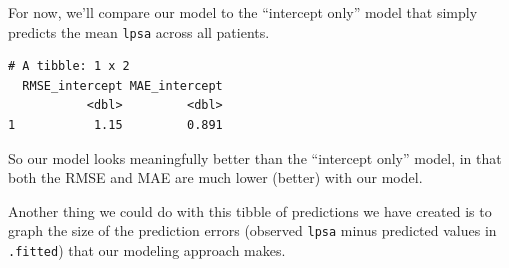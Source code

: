 \documentclass[]{book}
\newenvironment{Shaded}{\begin{snugshade}}{\end{snugshade}}
\newcommand{\KeywordTok}[1]{\textcolor[rgb]{0.13,0.29,0.53}{\textbf{#1}}}
\newcommand{\DataTypeTok}[1]{\textcolor[rgb]{0.13,0.29,0.53}{#1}}
\newcommand{\DecValTok}[1]{\textcolor[rgb]{0.00,0.00,0.81}{#1}}
\newcommand{\StringTok}[1]{\textcolor[rgb]{0.31,0.60,0.02}{#1}}
\newcommand{\OperatorTok}[1]{\textcolor[rgb]{0.81,0.36,0.00}{\textbf{#1}}}
\newcommand{\NormalTok}[1]{#1}
\theoremstyle{definition}
\theoremstyle{definition}
\theoremstyle{definition}
\theoremstyle{remark}
\begin{document}
For now, we'll compare our model to the ``intercept only'' model that
simply predicts the mean \texttt{lpsa} across all patients.

\begin{Shaded}
\end{Shaded}

\begin{verbatim}
# A tibble: 1 x 2
  RMSE_intercept MAE_intercept
           <dbl>         <dbl>
1           1.15         0.891
\end{verbatim}

So our model looks meaningfully better than the ``intercept only''
model, in that both the RMSE and MAE are much lower (better) with our
model.

Another thing we could do with this tibble of predictions we have
created is to graph the size of the prediction errors (observed
\texttt{lpsa} minus predicted values in \texttt{.fitted}) that our
modeling approach makes.

\begin{Shaded}
\end{Shaded}
\end{document}
